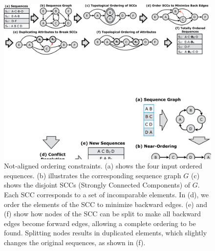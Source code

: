 \begin{figure}
\includegraphics[trim={0 18cm 0 0}, clip, width=\textwidth]{figures/partial_ordering2}
\caption{Not-aligned ordering constraints. (a) shows the four input ordered sequences. (b) illustrates the corresponding sequence graph $G$ (c) shows the disjoint SCCs  (Strongly Connected Components) of $G$. Each SCC corresponds to a set of incomparable elements. In (d), we order the elements of the SCC to minimize backward edges. (e) and (f) show how nodes of the SCC can be split to make all backward edges become forward edges, allowing a complete ordering to be found. Splitting nodes results in duplicated elements, which slightly changes the original sequences, as shown in (f).}
\label{fig:ordering}
\end{figure}


%




